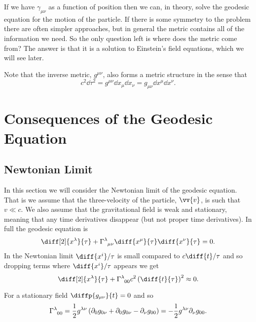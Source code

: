 \documentclass[fleqn]{NotesClass}
\newcommand*{\christoffel}[3]{\tensor{\Gamma}{^{#1}_{{#2}{#3}}}}
\begin{document}
    If we have \(\gamma_{\mu\nu}\) as a function of position then we can, in theory, solve the geodesic equation for the motion of the particle.
    If there is some symmetry to the problem there are often simpler approaches, but in general the metric contains all of the information we need.
    So the only question left is where does the metric come from?
    The answer is that it is a solution to Einstein's field equations, which we will see later.
    
    Note that the inverse metric, \(g^{\mu\nu}\), also forms a metric structure in the sense that
    \begin{equation}
        c^2\dd{\tau}^2 = g^{\mu\nu}\dd{x_\mu}\dd{x_\nu} = g_{\mu\nu}\dd{x^\mu}\dd{x^\nu}.
    \end{equation}

    \chapter{Consequences of the Geodesic Equation}
    \section{Newtonian Limit}
    In this section we will consider the Newtonian limit of the geodesic equation.
    That is we assume that the three-velocity of the particle, \(\vv{v}\), is such that \(v \ll c\).
    We also assume that the gravitational field is weak and stationary, meaning that any time derivatives disappear (but not proper time derivatives).
    In full the geodesic equation is
    \begin{equation}
        \diff[2]{x^\lambda}{\tau} + \christoffel{\lambda}{\mu}{\nu} \diff{x^\mu}{\tau} \diff{x^\nu}{\tau} = 0.
    \end{equation}
    In the Newtonian limit \(\diff{x^i}/{\tau}\) is small compared to \(c\diff{t}/{\tau}\) and so dropping terms where \(\diff{x^i}/{\tau}\) appears we get
    \begin{equation}
        \diff[2]{x^\lambda}{\tau} + \christoffel{\lambda}{0}{0} c^2 \left( \diff{t}{\tau} \right)^2 \approx 0.
    \end{equation}
    
    For a stationary field \(\diffp{g_{\mu\nu}}{t} = 0\) and so
    \begin{equation}
        \christoffel{\lambda}{0}{0} = \frac{1}{2}g^{\lambda\nu} \left( \partial_0 g_{0\nu} + \partial_0 g_{0\nu} - \partial_\nu g_{00} \right) = -\frac{1}{2}g^{\lambda\nu}\partial_\nu g_{00}.
    \end{equation}
    
\end{document}
